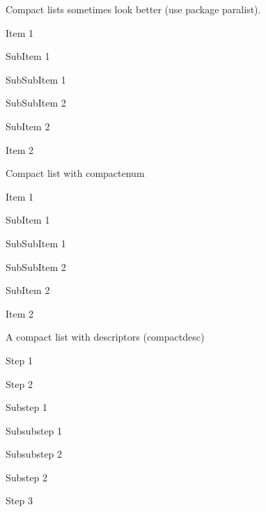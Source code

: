 Compact lists sometimes look better (use package paralist).

\begin{compactitem}
    \item Item 1
    \begin{compactitem}
        \item SubItem 1
        \begin{compactitem}
            \item SubSubItem 1
            \item SubSubItem 2
        \end{compactitem}
            \item SubItem 2
    \end{compactitem}
    \item Item 2
\end{compactitem}

Compact list with compactenum
\begin{compactenum}
    \item Item 1
    \begin{compactenum}
        \item SubItem 1
        \begin{compactenum}
            \item SubSubItem 1
            \item SubSubItem 2
        \end{compactenum}
            \item SubItem 2
    \end{compactenum}
    \item Item 2
\end{compactenum}

A compact list with descriptors (compactdesc)
\begin{compactdesc}
    \item[Step 1] Step 1 
    \item[Step 2] Step 2 
    \begin{compactdesc}
        \item[Substep 1] Substep 1 
            \begin{compactdesc}
                \item[Subsubstep 1] Subsubstep 1 
                \item[Subsubstep 2] Subsubstep 2 
            \end{compactdesc}
            \item[Substep 2] Substep 2 
    \item[Step 3] Step 3 
    \end{compactdesc}
\end{compactdesc}

